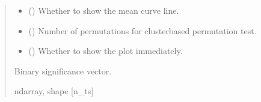\documentclass[letterpaper,10pt,english]{sphinxhowto}
\begin{document}
\begin{fulllineitems}
\begin{quote}
\begin{description}
\begin{itemize}
\item {} 
\sphinxAtStartPar
{} (\sphinxstyleliteralemphasis{\sphinxupquote{, }}) \textendash{} Whether to show the mean curve line.

\item {} 
\sphinxAtStartPar
{} (\sphinxstyleliteralemphasis{\sphinxupquote{, }}) \textendash{} Number of permutations for cluster\sphinxhyphen{}based permutation test.

\item {} 
\sphinxAtStartPar
{} (\sphinxstyleliteralemphasis{\sphinxupquote{, }}) \textendash{} Whether to show the plot immediately.

\end{itemize}

\sphinxAtStartPar
{} \textendash{} Binary significance vector.

\sphinxAtStartPar
ndarray, shape {[}n\_ts{]}

\end{description}\end{quote}

\end{fulllineitems}

\end{document}
